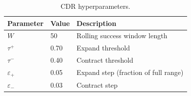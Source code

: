 \begin{table}[t]
\centering
\caption{CDR hyperparameters.}
\label{tab:cdr_params}
\begin{tabular}{lll}
\hline
\textbf{Parameter} & \textbf{Value} & \textbf{Description} \\
\hline
$W$           & 50       & Rolling success window length \\
$\tau^+$      & 0.70     & Expand threshold \\
$\tau^-$      & 0.40     & Contract threshold \\
$\varepsilon_+$ & 0.05   & Expand step (fraction of full range) \\
$\varepsilon_-$ & 0.03   & Contract step \\
\hline
\end{tabular}
\end{table}